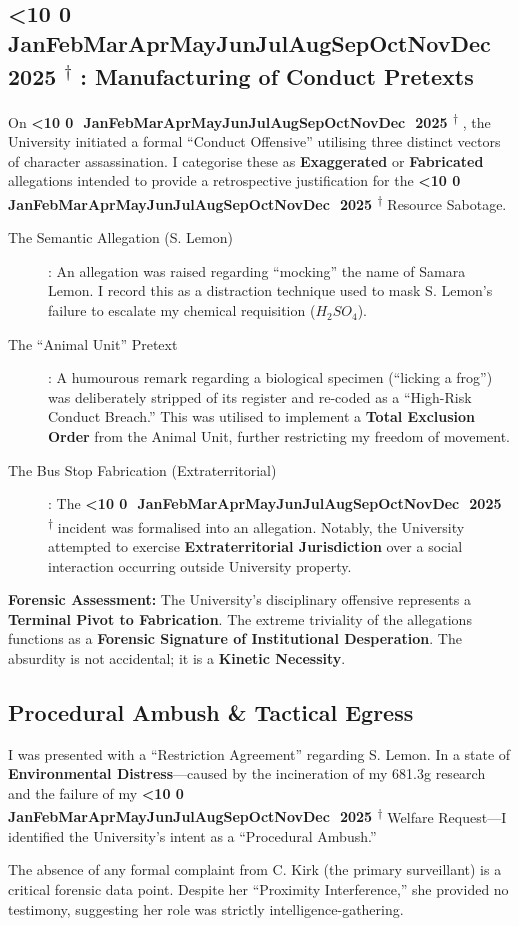 \documentclass{EMBASSY}
\DeclareRobustCommand{\gmt}[3]{%
    \texorpdfstring{%
        {\color{DateGold}\textbf{%
            \ifnum#1<10 0\fi#1\,\textperiodcentered\,%
            \ifcase#2\or Jan\or Feb\or Mar\or Apr\or May\or Jun\or Jul\or Aug\or Sep\or Oct\or Nov\or Dec\fi
            \,\textperiodcentered\,20#3%
            \textsuperscript{$\dagger$}%
        }}%
    }{%
        (#1/#2/#3)%
    }%
}
\begin{document}
\subsection{\gmt{6}{11}{25}: Manufacturing of Conduct Pretexts}
On \gmt{6}{11}{25}, the University initiated a formal ``Conduct Offensive'' utilising three distinct vectors of character assassination. I categorise these as \textbf{Exaggerated} or \textbf{Fabricated} allegations intended to provide a retrospective justification for the \gmt{3}{11}{25} Resource Sabotage.

\begin{description}
	\item[The Semantic Allegation (S. Lemon)]: An allegation was raised regarding ``mocking'' the name of Samara Lemon. I record this as a distraction technique used to mask S. Lemon’s failure to escalate my chemical requisition ($H_{2}SO_{4}$).
	\item[The ``Animal Unit'' Pretext]: A humourous remark regarding a biological specimen (``licking a frog'') was deliberately stripped of its register and re-coded as a ``High-Risk Conduct Breach.'' This was utilised to implement a \textbf{Total Exclusion Order} from the Animal Unit, further restricting my freedom of movement.
	\item[The Bus Stop Fabrication (Extraterritorial)]: The \gmt{3}{11}{25} incident was formalised into an allegation. Notably, the University attempted to exercise \textbf{Extraterritorial Jurisdiction} over a social interaction occurring outside University property.
\end{description}

\noindent\textbf{Forensic Assessment:} The University’s disciplinary offensive represents a \textbf{Terminal Pivot to Fabrication}. The extreme triviality of the allegations functions as a \textbf{Forensic Signature of Institutional Desperation}. The absurdity is not accidental; it is a \textbf{Kinetic Necessity}.

\subsection{Procedural Ambush \& Tactical Egress}
I was presented with a ``Restriction Agreement'' regarding S. Lemon. In a state of \textbf{Environmental Distress}---caused by the incineration of my 681.3g research and the failure of my \gmt{31}{10}{25} Welfare Request---I identified the University’s intent as a ``Procedural Ambush.''

The absence of any formal complaint from C. Kirk (the primary surveillant) is a critical forensic data point. Despite her ``Proximity Interference,'' she provided no testimony, suggesting her role was strictly intelligence-gathering.
\end{document}
